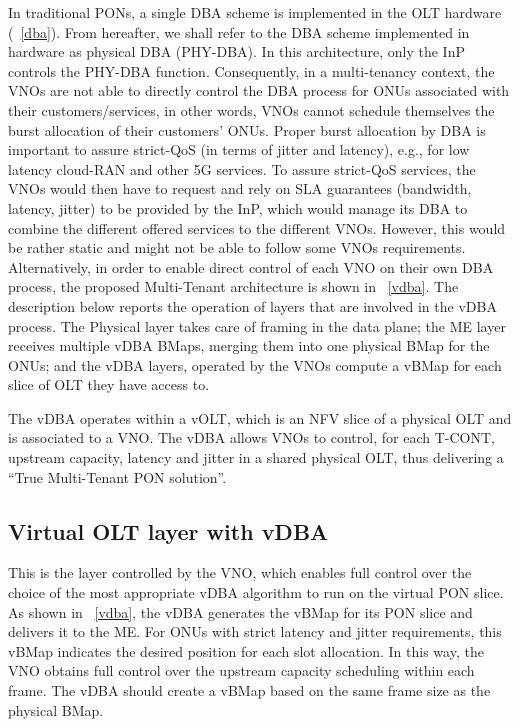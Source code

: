  In traditional \acp{PON}, a single \ac{DBA} scheme is implemented in the \ac{OLT} hardware (\figureautorefname~\ref{dba}). From hereafter, we shall refer to the \ac{DBA} scheme implemented in hardware as physical \ac{DBA} (PHY-\ac{DBA}). In this architecture, only the \ac{InP} controls the PHY-\ac{DBA} function. Consequently, in a multi-tenancy context, the \acp{VNO} are not able to directly control the \ac{DBA} process for \acp{ONU} associated with their customers/services, in other words, \acp{VNO} cannot schedule themselves the burst allocation of their customers' \acp{ONU}. Proper burst allocation by \ac{DBA} is important to assure strict-\ac{QoS} (in terms of jitter and latency), e.g., for low latency cloud-RAN and other \ac{5G} services. To assure strict-\ac{QoS} services, the \acp{VNO} would then have to request and rely on \ac{SLA} guarantees (bandwidth, latency, jitter) to be provided by the \ac{InP}, which would manage its \ac{DBA} to combine the different offered services to the different \acp{VNO}. However, this would be rather static and might not be able to follow some \acp{VNO} requirements. Alternatively, in order to enable direct control of each \ac{VNO} on their own \ac{DBA} process, the proposed Multi-Tenant architecture is shown in \figureautorefname~\ref{vdba}. The description below reports the operation of layers that are involved in the \ac{vDBA} process. The Physical layer takes care of framing in the data plane; the \ac{ME} layer receives multiple \ac{vDBA} \acp{BMap}, merging them into one physical \ac{BMap} for the \acp{ONU}; and the \ac{vDBA} layers, operated by the \acp{VNO} compute a \ac{vBMap} for each slice of \ac{OLT} they have access to.
 
  The \ac{vDBA} operates within a \ac{vOLT}, which is an NFV slice of a physical \ac{OLT} and is associated to a \ac{VNO}. The \ac{vDBA} allows \acp{VNO} to control, for each \ac{T-CONT}, upstream capacity, latency and jitter in a shared physical \ac{OLT}, thus delivering a “True Multi-Tenant \ac{PON} solution”. 
 


\subsection{Virtual \ac{OLT} layer with \ac{vDBA}}
This is the layer controlled by the \ac{VNO}, which enables full control over the choice of the most appropriate \ac{vDBA} algorithm to run on the virtual \ac{PON} slice. As shown in \figureautorefname~\ref{vdba}, the \ac{vDBA} generates the \ac{vBMap} for its \ac{PON} slice and delivers it to the \ac{ME}. For \acp{ONU} with strict latency and jitter requirements, this \ac{vBMap} indicates the desired position for each slot allocation. In this way, the \ac{VNO} obtains full control over the upstream capacity scheduling within each frame. The \ac{vDBA} should create a \ac{vBMap} based on the same frame size as the physical \ac{BMap}.


